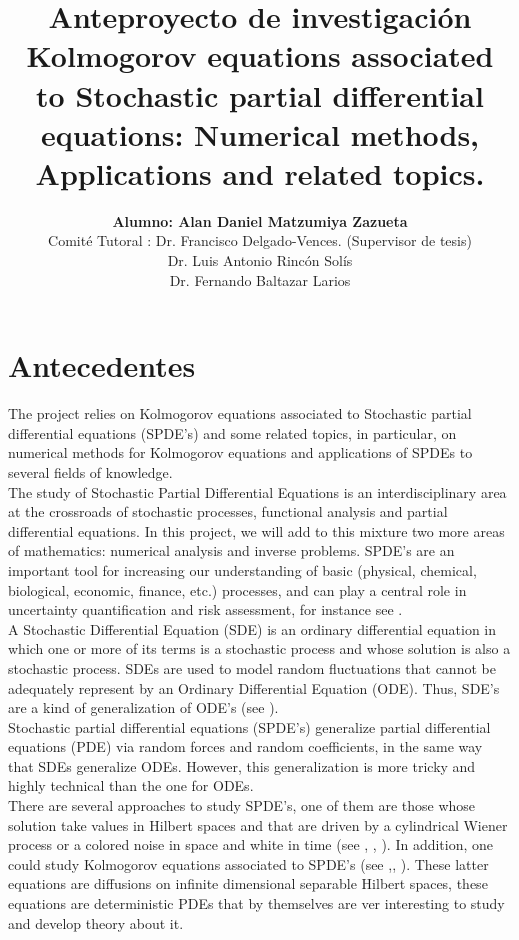 \documentclass{article}
\title{\vspace*{-3cm}\large\bf {\rm Anteproyecto de investigaci\'on}\\
Kolmogorov equations associated to Stochastic partial differential equations:  Numerical methods, Applications and related topics.}
\author{{\bf Alumno: Alan Daniel Matzumiya Zazueta}\\
Comit\'e Tutoral  :  Dr. Francisco Delgado-Vences. (Supervisor de tesis)\\
\hspace*{-.9cm} Dr. Luis Antonio Rinc\'on Sol\'{i}s\\
\hspace*{-.9cm} Dr. Fernando Baltazar Larios
}
\date{}
\numberwithin{equation}{section}
\begin{document}
\maketitle

\section{Antecedentes}
The project relies on Kolmogorov equations associated to Stochastic partial differential equations (SPDE's) and some related topics, in particular, on numerical methods for Kolmogorov equations and applications of SPDEs to several fields of knowledge. \\

The study of Stochastic Partial Differential Equations is an interdisciplinary area at the crossroads of stochastic processes, functional analysis and partial differential equations. In this project, we will add to this mixture two more areas of mathematics: numerical analysis and inverse problems.
SPDE's are an important tool for increasing our understanding of basic (physical, chemical, biological, economic, finance,
etc.) processes, and can play a central role in uncertainty quantification and risk assessment, for
instance see \cite{le-kn}. \\

A Stochastic Differential Equation (SDE) is an ordinary differential equation in which one or more of its terms is a
stochastic process and whose solution is also a stochastic process. SDEs are used to model
random fluctuations that cannot be adequately represent by an Ordinary Differential Equation (ODE).
Thus,  SDE's are a kind of generalization of ODE's (see \cite{ok}).\\


Stochastic partial differential equations (SPDE's) generalize partial differential equations (PDE) via random forces 
and random coefficients, in the same way that SDEs generalize ODEs. However, this generalization is more tricky and highly technical than the one for ODEs.\\ 


There are several approaches to study SPDE's, one of them are those whose solution take values in Hilbert spaces and that are driven by a cylindrical Wiener process or a colored noise in space and white in time (see \cite{da-za1}, \cite{lo-ro}, \cite{lo-ro-06}). 
In addition, one could study Kolmogorov equations associated to SPDE's (see \cite{da-za},\cite{da}, \cite{da1}).
These latter equations are diffusions on infinite dimensional separable Hilbert spaces, these equations are deterministic PDEs that by themselves are ver interesting to study and develop theory about it. \\
\end{document}
